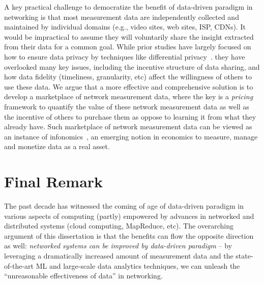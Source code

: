 A key practical challenge to democratize the benefit of data-driven paradigm in networking 
is that most measurement data are independently collected  and maintained by individual 
domains (e.g., video sites, web sites, ISP, CDNs). It would be impractical to assume they 
will voluntarily share  the insight extracted from their data for a common goal.
While prior studies have largely focused on how to ensure data privacy
by techniques like differential privacy~\cite{papadimitriou2017dstress,chen2015prism}. 
they have overlooked many key issues, including the 
incentive structure of data sharing, and how data fidelity (timeliness, 
granularity, etc) affect the willingness of others to use these data.
We argue that a more effective and comprehensive solution is to
develop a marketplace of network measurement data, where the key
is a {\em pricing} framework to quantify the value of these 
network measurement data as well as the incentive of others to 
purchase them as oppose to learning it from what they already have.
Such marketplace of network measurement data can be viewed
as an instance of infonomics~\cite{infonomics}, an emerging notion in economics
to measure, manage and monetize data as a real asset. 






\section{Final Remark}

The past decade has witnessed the coming of age of data-driven
paradigm in various aspects of computing (partly) empowered by advances
in networked and distributed systems (cloud computing, MapReduce, etc).
The overarching argument of this dissertation is that the benefits 
can flow the opposite direction as well:
{\em networked systems can be improved
by data-driven paradigm} -- 
by leveraging a dramatically increased amount of measurement data
and the state-of-the-art ML and large-scale data analytics techniques,
we can unleash the ``unreasonable effectiveness of data'' 
in networking.

